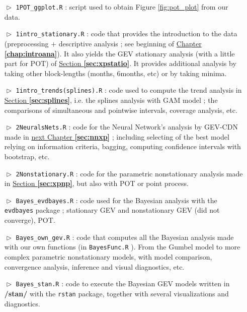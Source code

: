 \begin{itemize}
\begin{itemize}
\item[$\vartriangleright$]\texttt{1POT\_ggplot.R} : script used to obtain Figure \ref{fig:pot_plot} from our data. 

\item[$\vartriangleright$]\texttt{1intro\_stationary.R} : code that provides the introduction to the data (preprocessing + descriptive analysis ; see beginning of \hyperref[chap:introana]{Chapter \textbf{\ref{chap:introana}}}). It also yields the GEV stationary analysis (with a little part for POT) of  \hyperref[sec:xpstatio]{Section \textbf{\ref{sec:xpstatio}}}. It provides additional analysis by taking other block-lengths (months, 6months, etc) or by taking minima.

\item[$\vartriangleright$]\texttt{1intro\_trends(splines).R} : code used to compute the trend analysis in \hyperref[sec:splines]{Section \textbf{\ref{sec:splines}}}, i.e. the splines analysis with GAM model ; the comparisons of simultaneous and pointwise intervals, coverage analysis, etc.

\item[$\vartriangleright$]\texttt{2NeuralsNets.R} : code for the Neural Network's analysis by GEV-CDN made in \hyperref[sec:nnxp]{next Chapter \textbf{\ref{sec:nnxp}}} ; including selecting of the best model relying on information criteria, bagging, computing confidence intervals with bootstrap, etc. 

\item[$\vartriangleright$]\texttt{2Nonstationary.R} : code for the parametric nonstationary analysis made in \hyperref[sec:xpnp]{Section \textbf{\ref{sec:xpnp}}}, but also with POT or point process.

\item[$\vartriangleright$]\texttt{Bayes\_evdbayes.R} : code used for the Bayesian analysis with the \texttt{evdbayes} package ; stationary GEV and nonstationary GEV (did not converge), POT.

\item[$\vartriangleright$]\texttt{Bayes\_own\_gev.R} : code that computes all the Bayesian analysis made with our own functions (in \texttt{BayesFunc.R} ). From the Gumbel model to more complex parametric nonstationary models, with model comparison, convergence analysis, inference and visual diagnostics, etc.

\item[$\vartriangleright$]\texttt{Bayes\_stan.R} : code to execute the Bayesian GEV models written in \textbf{/stan/} with the \texttt{rstan} package, together with several visualizations and diagnostics.


\end{itemize}
\end{itemize}
